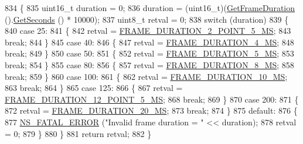\begin{DoxyCode}
834 \{
835   uint16\_t duration = 0;
836   duration = (uint16\_t)(\hyperlink{classns3_1_1WimaxPhy_a1eb798d21c180dee88590ca66f48c407}{GetFrameDuration} ().\hyperlink{classns3_1_1Time_a8f20d5c3b0902d7b4320982f340b57c8}{GetSeconds} () * 10000);
837   uint8\_t retval = 0;
838   \textcolor{keywordflow}{switch} (duration)
839     \{
840     \textcolor{keywordflow}{case} 25:
841       \{
842         retval = \hyperlink{classns3_1_1SimpleOfdmWimaxPhy_a81778c2233487351f2136fe80c63e1e4a8088f603308b22c4b3267ba8a0d3cb23}{FRAME\_DURATION\_2\_POINT\_5\_MS};
843         \textcolor{keywordflow}{break};
844       \}
845     \textcolor{keywordflow}{case} 40:
846       \{
847         retval = \hyperlink{classns3_1_1SimpleOfdmWimaxPhy_a81778c2233487351f2136fe80c63e1e4a31a8abe3f7708b2686cc2646d5702342}{FRAME\_DURATION\_4\_MS};
848         \textcolor{keywordflow}{break};
849       \}
850     \textcolor{keywordflow}{case} 50:
851       \{
852         retval = \hyperlink{classns3_1_1SimpleOfdmWimaxPhy_a81778c2233487351f2136fe80c63e1e4a0f6e0119b9e8ee1cbe3e6770b8fc520a}{FRAME\_DURATION\_5\_MS};
853         \textcolor{keywordflow}{break};
854       \}
855     \textcolor{keywordflow}{case} 80:
856       \{
857         retval = \hyperlink{classns3_1_1SimpleOfdmWimaxPhy_a81778c2233487351f2136fe80c63e1e4a114739c4a5e1bf73fab2a04b24809096}{FRAME\_DURATION\_8\_MS};
858         \textcolor{keywordflow}{break};
859       \}
860     \textcolor{keywordflow}{case} 100:
861       \{
862         retval = \hyperlink{classns3_1_1SimpleOfdmWimaxPhy_a81778c2233487351f2136fe80c63e1e4ae4800fe9d5b82ffb7c3e4f645de541be}{FRAME\_DURATION\_10\_MS};
863         \textcolor{keywordflow}{break};
864       \}
865     \textcolor{keywordflow}{case} 125:
866       \{
867         retval = \hyperlink{classns3_1_1SimpleOfdmWimaxPhy_a81778c2233487351f2136fe80c63e1e4a7e664cff7e9fc46eab639ea078130904}{FRAME\_DURATION\_12\_POINT\_5\_MS};
868         \textcolor{keywordflow}{break};
869       \}
870     \textcolor{keywordflow}{case} 200:
871       \{
872         retval = \hyperlink{classns3_1_1SimpleOfdmWimaxPhy_a81778c2233487351f2136fe80c63e1e4a1ba3ca55fc897ace9c0ab62f63fd1550}{FRAME\_DURATION\_20\_MS};
873         \textcolor{keywordflow}{break};
874       \}
875     \textcolor{keywordflow}{default}:
876       \{
877         \hyperlink{group__fatal_ga5131d5e3f75d7d4cbfd706ac456fdc85}{NS\_FATAL\_ERROR} (\textcolor{stringliteral}{"Invalid frame duration = "} << duration);
878         retval = 0;
879       \}
880     \}
881   \textcolor{keywordflow}{return} retval;
882 \}
\end{DoxyCode}


